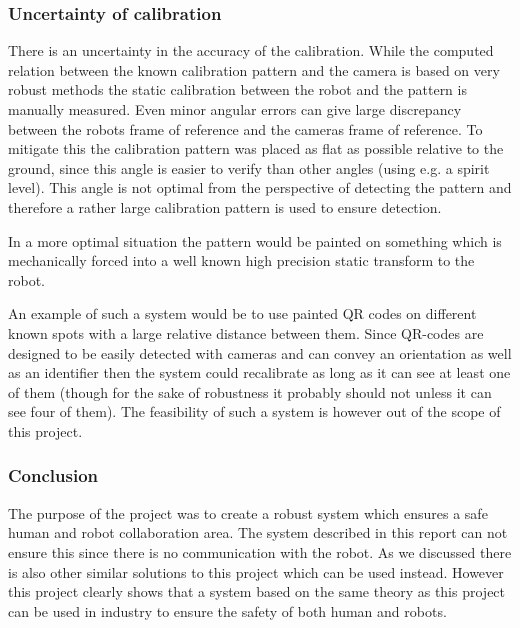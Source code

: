  

\subsubsection{Uncertainty of calibration}
There is an uncertainty in the accuracy of the calibration. While the computed relation between the known calibration pattern and the camera is based on very robust methods the static calibration between the robot and the pattern is manually measured. Even minor angular errors can give large discrepancy between the robots frame of reference and the cameras frame of reference. To mitigate this the calibration pattern was placed as flat as possible relative to the ground, since this angle is easier to verify than other angles (using e.g. a spirit level). This angle is not optimal from the perspective of detecting the pattern and therefore a rather large calibration pattern is used to ensure detection.

In a more optimal situation the pattern would be painted on something which is mechanically forced into a well known high precision static transform to the robot.

An example of such a system would be to use painted QR codes on different known spots with a large relative distance between them. Since QR-codes are designed to be easily detected with cameras and can convey an orientation as well as an identifier then the system could recalibrate as long as it can see at least one of them (though for the sake of robustness it probably should not unless it can see four of them). The feasibility of such a system is however out of the scope of this project.

\subsubsection{Conclusion}

The purpose of the project was to create a robust system which ensures a safe human and robot collaboration area. The system described in this report can not ensure this since there is no communication with the robot. As we discussed there is also other similar solutions to this project which can be used instead. However this project clearly shows that a system based on the same theory as this project can be used in industry to ensure the safety of both human and robots. 
